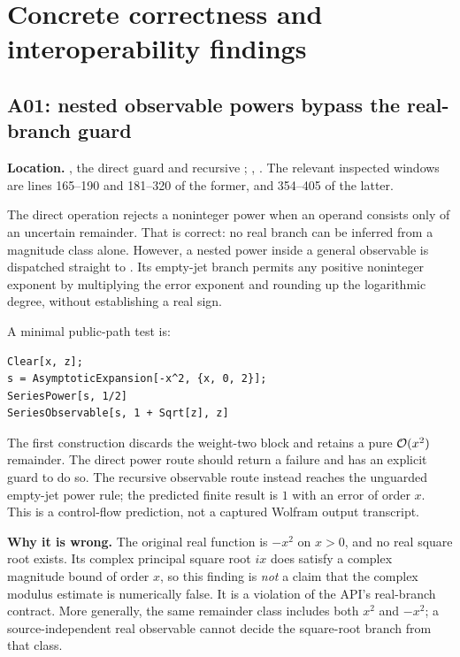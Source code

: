 \section{Concrete correctness and interoperability findings}
\subsection{A01: nested observable powers bypass the real-branch guard}\label{sec:a01}

\textbf{Location.} , the direct  guard and recursive ; , . The relevant inspected windows are lines 165--190 and 181--320 of the former, and 354--405 of the latter.\cite{operations,core}

The direct operation rejects a noninteger power when an operand consists only of an uncertain remainder. That is correct: no real branch can be inferred from a magnitude class alone. However, a nested power inside a general observable is dispatched straight to . Its empty-jet branch permits any positive noninteger exponent by multiplying the error exponent and rounding up the logarithmic degree, without establishing a real sign.

A minimal public-path test is:
\begin{lstlisting}
Clear[x, z];
s = AsymptoticExpansion[-x^2, {x, 0, 2}];
SeriesPower[s, 1/2]
SeriesObservable[s, 1 + Sqrt[z], z]
\end{lstlisting}
The first construction discards the weight-two block and retains a pure $\mathcal O(x^2)$ remainder. The direct power route should return a failure and has an explicit guard to do so. The recursive observable route instead reaches the unguarded empty-jet power rule; the predicted finite result is $1$ with an error of order $x$. This is a control-flow prediction, not a captured Wolfram output transcript.

\textbf{Why it is wrong.} The original real function is $-x^2$ on $x>0$, and no real square root exists. Its complex principal square root $ix$ does satisfy a complex magnitude bound of order $x$, so this finding is \emph{not} a claim that the complex modulus estimate is numerically false. It is a violation of the API's real-branch contract. More generally, the same remainder class includes both $x^2$ and $-x^2$; a source-independent real observable cannot decide the square-root branch from that class.

